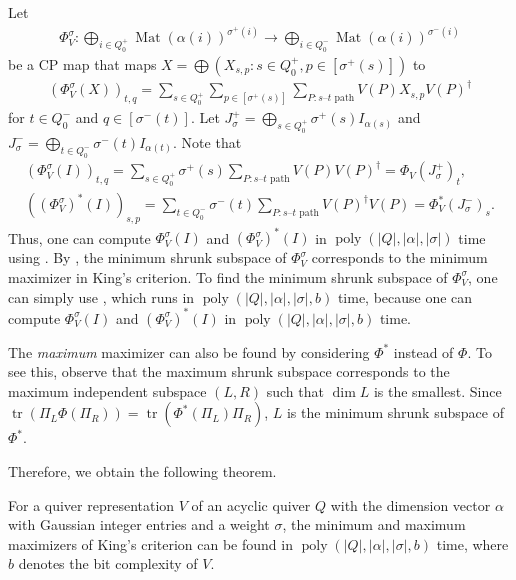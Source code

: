\documentclass[a4paper,11pt]{article}
\numberwithin{equation}{section}
\DeclareMathOperator{\Mat}{Mat}
\DeclareMathOperator{\tr}{tr}
\DeclareMathOperator{\poly}{poly}
\begin{document}
Let 
\begin{align}
    \Phi_V^\sigma: \bigoplus_{i \in Q_0^+} {\Mat(\alpha(i))}^{\sigma^+(i)} \to \bigoplus_{i \in Q_0^-} {\Mat(\alpha(i))}^{\sigma^-(i)}
\end{align}
be a CP map that maps $X = \bigoplus(X_{s,p} : s \in Q_0^+, p \in [\sigma^+(s)])$ to 
\begin{align}
    (\Phi_V^\sigma(X))_{t,q} = \sum_{s \in Q_0^+}\sum_{p \in [\sigma^+(s)]} \sum_{P: \text{$s$--$t$ path}} V(P) X_{s,p} V(P)^\dagger
\end{align}
for $t \in Q_0^-$ and $q \in [\sigma^-(t)]$.
Let  $J^+_\sigma = \bigoplus_{s \in Q_0^+} \sigma^+(s) I_{\alpha(s)}$ and $J^-_\sigma = \bigoplus_{t \in Q_0^-} \sigma^-(t) I_{\alpha(t)}$.
Note that
\begin{align}
    (\Phi_V^\sigma(I))_{t,q} = \sum_{s \in Q_0^+} \sigma^+(s) \sum_{P: \text{$s$--$t$ path}} V(P) V(P)^\dagger = \Phi_V(J^+_\sigma)_t, \\
    ((\Phi_V^\sigma)^*(I))_{s,p} = \sum_{t \in Q_0^-} \sigma^-(t) \sum_{P: \text{$s$--$t$ path}} V(P)^\dagger V(P) = \Phi_V^*(J^-_\sigma)_s.
\end{align}
Thus, one can compute $\Phi_V^\sigma(I)$ and $(\Phi_V^\sigma)^*(I)$ in $\poly(|Q|, |\alpha|, |\sigma|)$ time using .
By , the minimum shrunk subspace of $\Phi_V^\sigma$ corresponds to the minimum maximizer in King's criterion.
To find the minimum shrunk subspace of $\Phi_V^\sigma$, one can simply use , which runs in $\poly(|Q|, |\alpha|, |\sigma|, b)$ time, because one can compute $\Phi_V^\sigma(I)$ and $(\Phi_V^\sigma)^*(I)$ in $\poly(|Q|, |\alpha|, |\sigma|, b)$ time.

The \emph{maximum} maximizer can also be found by considering $\Phi^*$ instead of $\Phi$.
To see this, observe that the maximum shrunk subspace corresponds to the maximum independent subspace $(L, R)$ such that $\dim L$ is the smallest.
Since $\tr(\Pi_L \Phi(\Pi_R)) = \tr(\Phi^*(\Pi_L)\Pi_R)$, $L$ is the minimum shrunk subspace of $\Phi^*$.

Therefore, we obtain the following theorem.

\begin{theorem}\label{thm:King-maximizer}
    For a quiver representation $V$ of an acyclic quiver $Q$ with the dimension vector $\alpha$ with Gaussian integer entries and a weight $\sigma$, the minimum and maximum maximizers of King's criterion can be found in $\poly(|Q|, |\alpha|, |\sigma|, b)$ time, where $b$ denotes the bit complexity of $V$.
\end{theorem}
\end{document}
